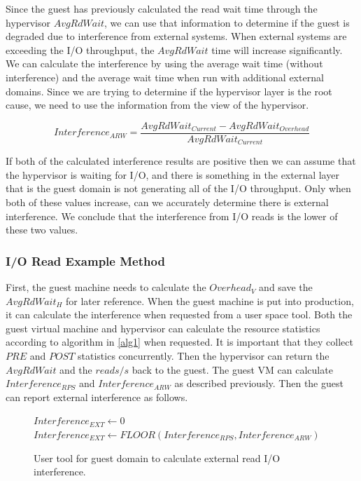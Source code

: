 Since the guest has previously calculated the read wait time through the hypervisor $AvgRdWait$, we can use that information to determine if the guest is degraded due to interference from external systems.  When external systems are exceeding the I/O throughput, the $AvgRdWait$ time will increase significantly.  We can calculate the interference by using the average wait time (without interference) and the average wait time when run with additional external domains.  Since we are trying to determine if the hypervisor layer is the root cause, we need to use the information from the view of the hypervisor.

\begin{equation}
	Interference_{ARW} = \frac{AvgRdWait_{Current} - AvgRdWait_{Overhead}}{AvgRdWait_{Current}} 
\end{equation}

If both of the calculated interference results are positive then we can assume that the hypervisor is waiting for I/O, and there is something in the external layer that is the guest domain is not generating all of the I/O throughput.
Only when both of these values increase, can we accurately determine there is external interference.
We conclude that the interference from I/O reads is the lower of these two values.

\subsubsection{I/O Read Example Method}
First, the guest machine needs to calculate the $Overhead_V$ and save the $AvgRdWait_H$ for later reference.  When the guest machine is put into production, it can calculate the interference when requested from a user space tool.  Both the guest virtual machine and hypervisor can calculate the resource statistics according to algorithm in \ref{alg1} when requested.  It is important that they collect $PRE$ and $POST$ statistics concurrently.  Then the hypervisor can return the $AvgRdWait$ and the $reads/s$ back to the guest.   The guest VM can calculate $Interference_{RPS}$ and $Interference_{ARW}$ as described previously.   Then the guest can report external interference as follows.

\begin{figure}[h]
\begin{algorithmic}[H]
 \STATE $Interference_{EXT} \gets 0$
 	\STATE $Interference_{EXT} \gets FLOOR(Interference_{RPS}, Interference_{ARW})$  
 \ENDIF
\end{algorithmic}
\label{alg2}
\caption{User tool for guest domain to calculate external read I/O interference.}
\end{figure}

